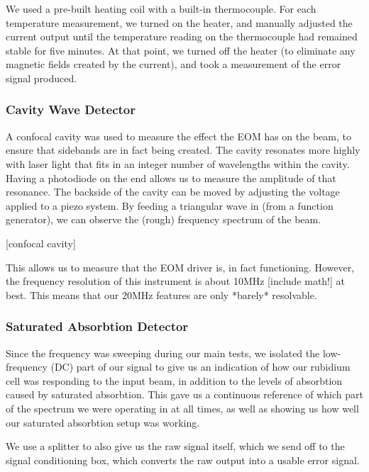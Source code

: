 We used a pre-built heating coil with a built-in thermocouple.  For each temperature measurement, we turned on the heater, and manually adjusted the current output until the temperature reading on the thermocouple had remained stable for five minutes.  At that point, we turned off the heater (to eliminate any magnetic fields created by the current), and took a measurement of the error signal produced.
    
    \subsubsection{Cavity Wave Detector}
    
A confocal cavity was used to measure the effect the EOM has on the beam, to ensure that sidebands are in fact being created.  The cavity resonates more highly with laser light that fits in an integer number of wavelengths within the cavity.  Having a photodiode on the end allows us to measure the amplitude of that resonance.  The backside of the cavity can be moved by adjusting the voltage applied to a piezo system.  By feeding a triangular wave in (from a function generator), we can observe the (rough) frequency spectrum of the beam.

[confocal cavity]

This allows us to measure that the EOM driver is, in fact functioning.  However, the frequency resolution of this instrument is about 10MHz [include math!] at best.  This means that our 20MHz features are only *barely* resolvable.
    
    \subsubsection{Saturated Absorbtion Detector}
    
Since the frequency was sweeping during our main tests, we isolated the low-frequency (DC) part of our signal to give us an indication of how our rubidium cell was responding to the input beam, in addition to the levels of absorbtion caused by saturated absorbtion.  This gave us a continuous reference of which part of the spectrum we were operating in at all times, as well as showing us how well our saturated absorbtion setup was working.

We use a splitter to also give us the raw signal itself, which we send off to the signal conditioning box, which converts the raw output into a usable error signal.

